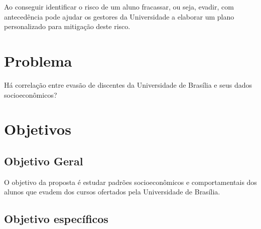 Ao conseguir identificar o risco de um aluno fracassar, ou seja, evadir, com antecedência pode ajudar os gestores da Universidade a elaborar um plano personalizado para mitigação deste risco.

\section{Problema}%

Há correlação entre evasão de discentes da Universidade de Brasília e seus dados socioeconômicos?
\section{Objetivos}%

\subsection{Objetivo Geral}

O objetivo da proposta é estudar padrões socioeconômicos e comportamentais dos alunos que evadem dos cursos ofertados pela Universidade de Brasília. 
 
\subsection{Objetivo específicos}

